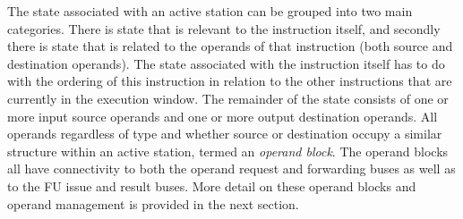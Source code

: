 \documentclass{book}
\begin{document}
%
The state associated with an active station can be grouped into
two main categories.  There is state that is relevant to
the instruction itself, and secondly there is state that is
related to the operands of that instruction (both source and
destination operands).
The state associated with the instruction itself has to do
with the ordering of this instruction in relation to the other
instructions that are currently in the execution window.
The remainder of the state consists of one or more input
source operands and one or more output destination operands.
All operands regardless of type and whether source or destination
occupy a similar structure within an active station, termed an
\textit{operand block}.
The operand blocks all have connectivity to both the
operand request and forwarding buses as well as to the FU
issue and result buses.
More detail on these operand blocks and operand management
is provided in the next section.
\end{document}
